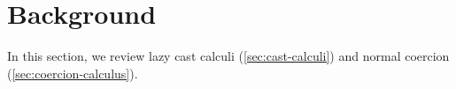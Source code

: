 \documentclass[acmsmall,review,anonymous]{acmart}\settopmatter{printfolios=true,printccs=false,printacmref=false}
\newcommand{\lazyUD}{Lazy\;UD}
\newcommand{\lazyD}{Lazy\;D}
\begin{document}
%

\section{Background} \label{sec:background}

In this section, we review lazy cast calculi (\ref{sec:cast-calculi}) and
normal coercion (\ref{sec:coercion-calculus}). 
\end{document}
